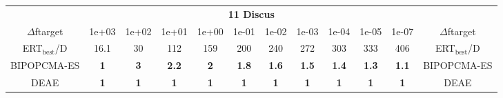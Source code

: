 \begin{tabular}{cccccccccccc}
 & \multicolumn{10}{c}{{\normalsize \textbf{11 Discus}}}\\
$\Delta$ftarget& 1e+03& 1e+02& 1e+01& 1e+00& 1e-01& 1e-02& 1e-03& 1e-04& 1e-05& 1e-07 & $\Delta$ftarget \\
ERT$_{\textrm{best}}$/D& 16.1& 30& 112& 159& 200& 240& 272& 303& 333& 406 & ERT$_{\textrm{best}}$/D \\
\hline
BIPOPCMA-ES & \textbf{1} & \textbf{3} & \textbf{2.2} & \textbf{2} & \textbf{1.8} & \textbf{1.6} & \textbf{1.5} & \textbf{1.4} & \textbf{1.3} & \textbf{1.1} & BIPOPCMA-ES \cite{add_an_entry_for_BIPOPCMA-ES_in_bbob.bib}\\
DEAE & \textbf{1} & \textbf{1} & \textbf{1} & \textbf{1} & \textbf{1} & \textbf{1} & \textbf{1} & \textbf{1} & \textbf{1} & \textbf{1} & DEAE \cite{add_an_entry_for_DEAE_in_bbob.bib}
\end{tabular}
